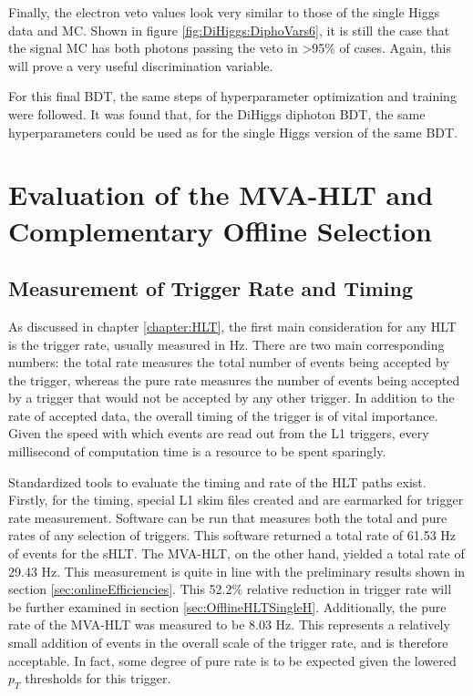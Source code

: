 \documentclass[12pt]{ucsddissertation}
\begin{document}
Finally, the electron veto values look very similar to those of the single Higgs data and MC. Shown in figure \ref{fig:DiHiggs:DiphoVars6}, it is still the case that the signal MC has both photons passing the veto in \textgreater 95\% of cases. Again, this will prove a very useful discrimination variable.

For this final BDT, the same steps of hyperparameter optimization and training were followed. It was found that, for the DiHiggs diphoton BDT, the same hyperparameters could be used as for the single Higgs version of the same BDT. 

\chapter{Evaluation of the MVA-HLT and Complementary Offline Selection} \label{chapter:Results}

\section{Measurement of Trigger Rate and Timing} \label{sec:TriggerRate}
As discussed in chapter \ref{chapter:HLT}, the first main consideration for any HLT is the trigger rate, usually measured in Hz. There are two main corresponding numbers: the total rate measures the total number of events being accepted by the trigger, whereas the pure rate measures the number of events being accepted by a trigger that would not be accepted by any other trigger. In addition to the rate of accepted data, the overall timing of the trigger is of vital importance. Given the speed with which events are read out from the L1 triggers, every millisecond of computation time is a resource to be spent sparingly. 

Standardized tools to evaluate the timing and rate of the HLT paths exist. Firstly, for the timing, special L1 skim files created and are earmarked for trigger rate measurement. Software can be run that measures both the total and pure rates of any selection of triggers. This software returned a total rate of 61.53 Hz of events for the sHLT. The MVA-HLT, on the other hand, yielded a total rate of 29.43 Hz. This measurement is quite in line with the preliminary results shown in section \ref{sec:onlineEfficiencies}. This 52.2\% relative reduction in trigger rate will be further examined in section \ref{sec:OfflineHLTSingleH}. Additionally, the pure rate of the MVA-HLT was measured to be 8.03 Hz. This represents a relatively small addition of events in the overall scale of the trigger rate, and is therefore acceptable. In fact, some degree of pure rate is to be expected given the lowered $p_T$ thresholds for this trigger.
\end{document}
